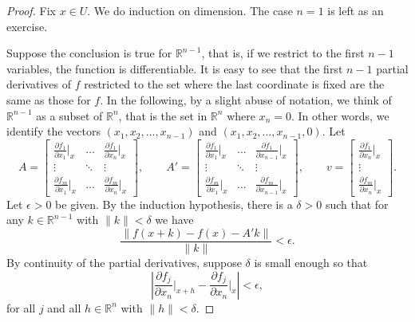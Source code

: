 \documentclass[12pt,openany]{book}
\newcommand{\snorm}[1]{\lVert {#1} \rVert}
\newcommand{\abs}[1]{\left\lvert {#1} \right\rvert}
\newcommand{\R}{{\mathbb{R}}}
\theoremstyle{plain}
\theoremstyle{remark}
\theoremstyle{definition}
\theoremstyle{exercise}
\theoremstyle{example}
\begin{document}
\begin{proof}
Fix $x \in U$.  We do induction on dimension.  The case $n=1$ is left
as an exercise.

Suppose the conclusion is true for $\R^{n-1}$,
that is,
if we restrict to the first $n-1$ variables, the function is differentiable.
It is easy to see that the first $n-1$
partial derivatives of $f$ restricted to the set where the last coordinate is
fixed are the same as those for $f$.
In the following, by a slight abuse of notation,
we think of $\R^{n-1}$ as a subset of $\R^n$, that is the set in $\R^n$ where $x_n = 0$.
In other words, we identify the vectors $(x_1,x_2,\ldots,x_{n-1})$ and
$(x_1,x_2,\ldots,x_{n-1},0)$.
Let
\begin{equation*}
A = 
\begin{bmatrix}
\frac{\partial f_1}{\partial x_1}\big|_x
& \ldots &
\frac{\partial f_1}{\partial x_n}\big|_x
\\
\vdots & \ddots & \vdots
\\
\frac{\partial f_m}{\partial x_1}\big|_x
& \ldots &
\frac{\partial f_m}{\partial x_n}\big|_x
\end{bmatrix} ,
\qquad
A' = 
\begin{bmatrix}
\frac{\partial f_1}{\partial x_1}\big|_x
& \ldots &
\frac{\partial f_1}{\partial x_{n-1}}\big|_x
\\
\vdots & \ddots & \vdots
\\
\frac{\partial f_m}{\partial x_1}\big|_x
& \ldots &
\frac{\partial f_m}{\partial x_{n-1}}\big|_x
\end{bmatrix} ,
\qquad
v = 
\begin{bmatrix}
\frac{\partial f_1}{\partial x_n}\big|_x
\\
\vdots
\\
\frac{\partial f_m}{\partial x_n}\big|_x
\end{bmatrix} .
\end{equation*}
Let $\epsilon > 0$ be given.  By the induction hypothesis, there
is a $\delta > 0$ such that
for any $k \in \R^{n-1}$ with $\snorm{k} < \delta$ we have
\begin{equation*}
\frac{\snorm{f(x+k) - f(x) - A' k}}{\snorm{k}} < \epsilon .
\end{equation*}
By continuity of the partial derivatives, suppose $\delta$ is small
enough so that
\begin{equation*}
\abs{\frac{\partial f_j}{\partial x_n}\Big|_{x+h}
      - \frac{\partial f_j}{\partial x_n}\Big|_{x}} < \epsilon ,
\end{equation*}
for all $j$ and all $h \in \R^n$ with $\snorm{h} < \delta$.


\end{proof}
\end{document}
